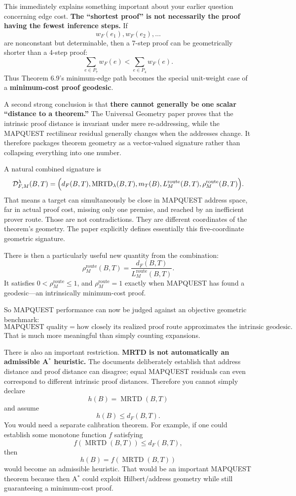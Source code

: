 \documentclass[11pt]{article}
\theoremstyle{definition}
\theoremstyle{remark}
\newcommand{\MRTD}{\operatorname{MRTD}}
\newcommand{\route}{\mathrm{route}}
\begin{document}
This immediately explains something important about your earlier question concerning edge cost. \textbf{The ``shortest proof'' is not necessarily the proof having the fewest inference steps.} If
\[
w_F(e_1),w_F(e_2),\ldots
\]
are nonconstant but determinable, then a 7-step proof can be geometrically shorter than a 4-step proof:
\[
\sum_{e\in P_7}w_F(e)<\sum_{e\in P_4}w_F(e).
\]
Thus Theorem 6.9's minimum-edge path becomes the special unit-weight case of a \textbf{minimum-cost proof geodesic}.

A second strong conclusion is that \textbf{there cannot generally be one scalar ``distance to a theorem.''} The Universal Geometry paper proves that the intrinsic proof distance is invariant under mere re-addressing, while the MAPQUEST rectilinear residual generally changes when the addresses change. It therefore packages theorem geometry as a vector-valued signature rather than collapsing everything into one number.

A natural combined signature is
\[
\mathcal D_{F,M}^{\lambda}(B,T)
=
\Bigl(d_F(B,T),\MRTD_{\lambda}(B,T),m_T(B),L_M^{\route}(B,T),\rho_M^{\route}(B,T)\Bigr).
\]
That means a target can simultaneously be close in MAPQUEST address space, far in actual proof cost, missing only one premise, and reached by an inefficient prover route. Those are not contradictions. They are different coordinates of the theorem's geometry. The paper explicitly defines essentially this five-coordinate geometric signature.

There is then a particularly useful new quantity from the combination:
\[
\rho_M^{\route}(B,T)=\frac{d_F(B,T)}{L_M^{\route}(B,T)}.
\]
It satisfies $0<\rho_M^{\route}\le1$, and $\rho_M^{\route}=1$ exactly when MAPQUEST has found a geodesic---an intrinsically minimum-cost proof.

So MAPQUEST performance can now be judged against an objective geometric benchmark:
\[
\boxed{\text{MAPQUEST quality}=\text{how closely its realized proof route approximates the intrinsic geodesic}.}
\]
That is much more meaningful than simply counting expansions.

There is also an important restriction. \textbf{MRTD is not automatically an admissible A$^*$ heuristic.} The documents deliberately establish that address distance and proof distance can disagree; equal MAPQUEST residuals can even correspond to different intrinsic proof distances. Therefore you cannot simply declare
\[
h(B)=\MRTD(B,T)
\]
and assume
\[
h(B)\le d_F(B,T).
\]
You would need a separate calibration theorem. For example, if one could establish some monotone function $f$ satisfying
\[
f(\MRTD(B,T))\le d_F(B,T),
\]
then
\[
h(B)=f(\MRTD(B,T))
\]
would become an admissible heuristic. That would be an important MAPQUEST theorem because then A$^*$ could exploit Hilbert/address geometry while still guaranteeing a minimum-cost proof.
\end{document}
